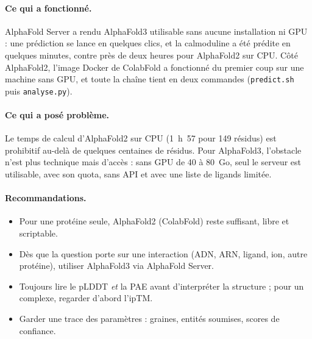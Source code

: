 \paragraph{Ce qui a fonctionné.} AlphaFold Server a rendu AlphaFold3 utilisable sans aucune installation ni GPU : une prédiction se lance en quelques clics, et la calmoduline a été prédite en quelques minutes, contre près de deux heures pour AlphaFold2 sur CPU. Côté AlphaFold2, l'image Docker de ColabFold a fonctionné du premier coup sur une machine sans GPU, et toute la chaîne tient en deux commandes (\texttt{predict.sh} puis \texttt{analyse.py}).

\paragraph{Ce qui a posé problème.} Le temps de calcul d'AlphaFold2 sur CPU (1~h~57 pour 149 résidus) est prohibitif au-delà de quelques centaines de résidus. Pour AlphaFold3, l'obstacle n'est plus technique mais d'accès : sans GPU de 40 à 80~Go, seul le serveur est utilisable, avec son quota, sans API et avec une liste de ligands limitée.

\paragraph{Recommandations.}
\begin{itemize}
  \item Pour une protéine seule, AlphaFold2 (ColabFold) reste suffisant, libre et scriptable.
  \item Dès que la question porte sur une interaction (ADN, ARN, ligand, ion, autre protéine), utiliser AlphaFold3 via AlphaFold Server.
  \item Toujours lire le pLDDT \emph{et} la PAE avant d'interpréter la structure ; pour un complexe, regarder d'abord l'ipTM.
  \item Garder une trace des paramètres : graines, entités soumises, scores de confiance.
\end{itemize}
